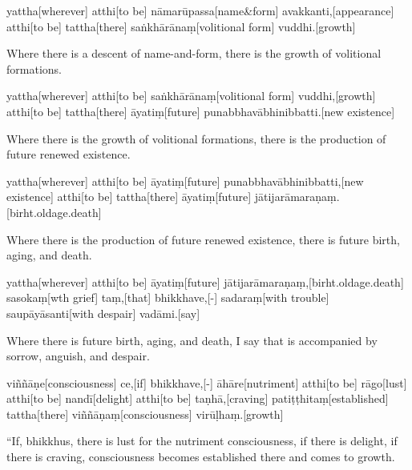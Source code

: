 \begin{samepage}
\begingl[glneveryline={\PaliGlossA,\PaliGlossB}]
yattha[wherever] atthi[to be] nāmarūpassa[name\&form] avakkanti,[appearance] atthi[to be] tattha[there] saṅkhārānaṃ[volitional form] vuddhi.[growth]
\endgl
\nopagebreak
\linespread{0.5}
\begin{spacin}{0.2}
{\PaliGlossFT Where there is a descent of name-and-form, there is the growth of volitional formations.}
\end{spacin}
\vskip 12pt
\end{samepage}
\begin{samepage}
\begingl[glneveryline={\PaliGlossA,\PaliGlossB}]
yattha[wherever] atthi[to be] saṅkhārānaṃ[volitional form] vuddhi,[growth] atthi[to be] tattha[there] āyatiṃ[future] punabbhavābhinibbatti.[new existence]
\endgl
\nopagebreak
\linespread{0.5}
\begin{spacin}{0.2}
{\PaliGlossFT Where there is the growth of volitional formations, there is the production of future renewed existence.}
\end{spacin}
\vskip 12pt
\end{samepage}
\begin{samepage}
\begingl[glneveryline={\PaliGlossA,\PaliGlossB}]
yattha[wherever] atthi[to be] āyatiṃ[future] punabbhavābhinibbatti,[new existence] atthi[to be] tattha[there] āyatiṃ[future] jātijarāmaraṇaṃ.[birht.oldage.death]
\endgl
\nopagebreak
\linespread{0.5}
\begin{spacin}{0.2}
{\PaliGlossFT Where there is the production of future renewed existence, there is future birth, aging, and death.}
\end{spacin}
\vskip 12pt
\end{samepage}
\begin{samepage}
\begingl[glneveryline={\PaliGlossA,\PaliGlossB}]
yattha[wherever] atthi[to be] āyatiṃ[future] jātijarāmaraṇaṃ,[birht.oldage.death] sasokaṃ[wth grief] taṃ,[that] bhikkhave,[-] sadaraṃ[with trouble] saupāyāsanti[with despair] vadāmi.[say]
\endgl
\nopagebreak
\linespread{0.5}
\begin{spacin}{0.2}
{\PaliGlossFT Where there is future birth, aging, and death, I say that is accompanied by sorrow, anguish, and despair.}
\end{spacin}
\vskip 12pt
\end{samepage}
\vskip 0.2in
\begin{samepage}
\begingl[glneveryline={\PaliGlossA,\PaliGlossB}]
viññāṇe[consciousness] ce,[if] bhikkhave,[-] āhāre[nutriment] atthi[to be] rāgo[lust] atthi[to be] nandī[delight] atthi[to be] taṇhā,[craving] patiṭṭhitaṃ[established] tattha[there] viññāṇaṃ[consciousness] virūḷhaṃ.[growth]
\endgl
\nopagebreak
\linespread{0.5}
\begin{spacin}{0.2}
{\PaliGlossFT “If, bhikkhus, there is lust for the nutriment consciousness, if there is delight, if there is craving, consciousness becomes established there and comes to growth.}
\end{spacin}
\vskip 12pt
\end{samepage}
